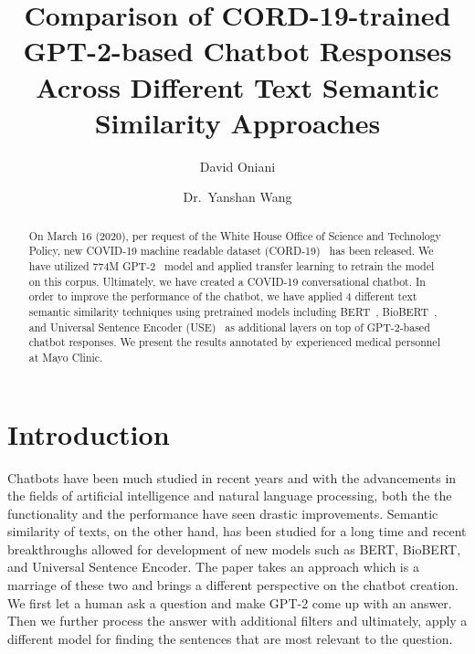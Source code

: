 \documentclass[sigconf,natbib=false]{acmart}
\title{Comparison of CORD-19-trained GPT-2-based Chatbot Responses Across
  Different Text Semantic Similarity Approaches}
\author{David Oniani}
\affiliation{%
  \institution{Mayo Clinic}
  \city{Rochester}
  \state{MN}
  \country{USA}}
\author{Dr.~Yanshan Wang}
\affiliation{%
  \institution{Mayo Clinic}
  \city{Rochester}
  \state{MN}
  \country{USA}}
\begin{document}

\begin{abstract}

  On March 16 (2020), per request of the White House Office of Science and
  Technology Policy, new COVID-19 machine readable dataset
  (CORD-19)~\cite{whitehousecovid2020} has been released. We have utilized 774M
  GPT-2~\cite{radford2019language} model and applied transfer learning to
  retrain the model on this corpus. Ultimately, we have created a COVID-19
  conversational chatbot. In order to improve the performance of the chatbot,
  we have applied 4 different text semantic similarity techniques using
  pretrained models including BERT~\cite{turc2019}, BioBERT~\cite{btz682}, and
  Universal Sentence Encoder (USE)~\cite{use} as additional layers on top of
  GPT-2-based chatbot responses. We present the results annotated by
  experienced medical personnel at Mayo Clinic.

\end{abstract}


\maketitle


\section{Introduction}

Chatbots have been much studied in recent years and with the advancements in
the fields of artificial intelligence and natural language processing, both the
the functionality and the performance have seen drastic improvements. Semantic
similarity of texts, on the other hand, has been studied for a long time and
recent breakthroughs allowed for development of new models such as BERT,
BioBERT, and Universal Sentence Encoder. The paper takes an approach which is a
marriage of these two and brings a different perspective on the chatbot
creation. We first let a human ask a question and make GPT-2 come up with an
answer. Then we further process the answer with additional filters and
ultimately, apply a different model for finding the sentences that are most
relevant to the question.
\end{document}
